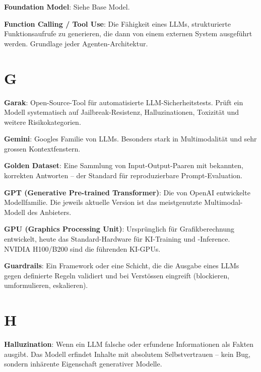 \textbf{Foundation Model}\hspace{0pt}: Siehe Base Model.

\textbf{Function Calling / Tool Use}\hspace{0pt}: Die Fähigkeit eines LLMs, strukturierte Funktionsaufrufe zu generieren, die dann von einem externen System ausgeführt werden. Grundlage jeder Agenten-Architektur.

\section{G}

\textbf{Garak}\hspace{0pt}: Open-Source-Tool für automatisierte LLM-Sicherheitstests. Prüft ein Modell systematisch auf Jailbreak-Resistenz, Halluzinationen, Toxizität und weitere Risikokategorien.

\textbf{Gemini}\hspace{0pt}: Googles Familie von LLMs. Besonders stark in Multimodalität und sehr grossen Kontextfenstern.

\textbf{Golden Dataset}\hspace{0pt}: Eine Sammlung von Input-Output-Paaren mit bekannten, korrekten Antworten -- der Standard für reproduzierbare Prompt-Evaluation.

\textbf{GPT (Generative Pre-trained Transformer)}\hspace{0pt}: Die von OpenAI entwickelte Modellfamilie. Die jeweils aktuelle Version ist das meistgenutzte Multimodal-Modell des Anbieters.

\textbf{GPU (Graphics Processing Unit)}\hspace{0pt}: Ursprünglich für Grafikberechnung entwickelt, heute das Standard-Hardware für KI-Training und -Inference. NVIDIA H100/B200 sind die führenden KI-GPUs.

\textbf{Guardrails}\hspace{0pt}: Ein Framework oder eine Schicht, die die Ausgabe eines LLMs gegen definierte Regeln validiert und bei Verstössen eingreift (blockieren, umformulieren, eskalieren).

\section{H}

\textbf{Halluzination}\hspace{0pt}: Wenn ein LLM falsche oder erfundene Informationen als Fakten ausgibt. Das Modell erfindet Inhalte mit absolutem Selbstvertrauen -- kein Bug, sondern inhärente Eigenschaft generativer Modelle.




